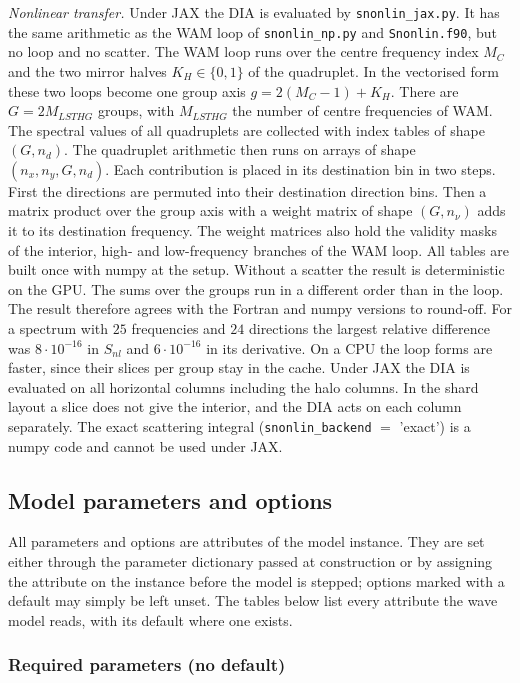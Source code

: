 \documentclass[12pt]{article}
\begin{document}
\emph{Nonlinear transfer.} Under JAX the DIA is evaluated by \verb|snonlin_jax.py|.
It has the same arithmetic as the WAM loop of \verb|snonlin_np.py| and \verb|Snonlin.f90|,
but no loop and no scatter.
The WAM loop runs over the centre frequency index $M_C$ and the two mirror halves
$K_H \in \{0,1\}$ of the quadruplet.
In the vectorised form these two loops become one group axis $g = 2(M_C-1) + K_H$.
There are $G = 2 M_{LSTHG}$ groups, with $M_{LSTHG}$ the number of centre frequencies of WAM.
The spectral values of all quadruplets are collected with index tables of shape $(G, n_d)$.
The quadruplet arithmetic then runs on arrays of shape $(n_x, n_y, G, n_d)$.
Each contribution is placed in its destination bin in two steps.
First the directions are permuted into their destination direction bins.
Then a matrix product over the group axis with a weight matrix of shape $(G, n_\nu)$
adds it to its destination frequency.
The weight matrices also hold the validity masks of the interior, high- and low-frequency
branches of the WAM loop.
All tables are built once with numpy at the setup.
Without a scatter the result is deterministic on the GPU.
The sums over the groups run in a different order than in the loop.
The result therefore agrees with the Fortran and numpy versions to round-off.
For a spectrum with $25$ frequencies and $24$ directions the largest relative difference was
$8\cdot 10^{-16}$ in $S_{nl}$ and $6\cdot 10^{-16}$ in its derivative.
On a CPU the loop forms are faster, since their slices per group stay in the cache.
Under JAX the DIA is evaluated on all horizontal columns including the halo columns.
In the shard layout a slice does not give the interior, and the DIA acts on each column separately.
The exact scattering integral (\verb|snonlin_backend| $=$ 'exact') is a numpy code
and cannot be used under JAX.


\subsection*{Model parameters and options}

All parameters and options are attributes of the model instance. They are set
either through the parameter dictionary passed at construction or by assigning
the attribute on the instance before the model is stepped; options marked with
a default may simply be left unset. The tables below list every attribute the
wave model reads, with its default where one exists.

\subsubsection*{Required parameters (no default)}
\end{document}

